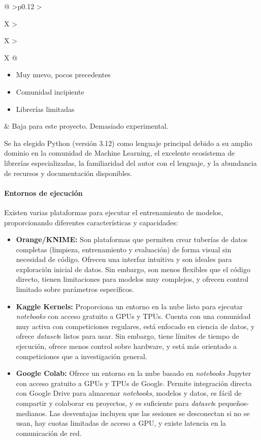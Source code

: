 \begin{xltabular}{\textwidth}{@{} >{\centering\arraybackslash}p{0.12\textwidth} >{\raggedright\arraybackslash}X >{\raggedright\arraybackslash}X >{\raggedright\arraybackslash}X @{}}
	\begin{itemize}[nosep] \item Muy nuevo, pocos precedentes \item Comunidad incipiente \item Librerías limitadas \end{itemize} &
	Baja para este proyecto. Demasiado experimental. \\
\end{xltabular}
{\captionsetup{type=table,hypcap=false}\label{tab:comparativa_lenguajes_ann}}

\normalsize

Se ha elegido Python (versión 3.12) como lenguaje principal debido a su amplio dominio en la comunidad de Machine Learning, el excelente ecosistema de librerías especializadas, la familiaridad del autor con el lenguaje, y la abundancia de recursos y documentación disponibles.

\paragraph{Entornos de ejecución}

Existen varias plataformas para ejecutar el entrenamiento de modelos, proporcionando diferentes características y capacidades:

\begin{itemize}
    \item \textbf{Orange/KNIME:} Son plataformas que permiten crear tuberías de datos completas (limpieza, entrenamiento y evaluación) de forma visual sin necesidad de código. Ofrecen una interfaz intuitiva y son ideales para exploración inicial de datos. Sin embargo, son menos flexibles que el código directo, tienen limitaciones para modelos muy complejos, y ofrecen control limitado sobre parámetros específicos.
    
    \item \textbf{Kaggle Kernels:} Proporciona un entorno en la nube listo para ejecutar \textit{notebooks} con acceso gratuito a GPUs y TPUs. Cuenta con una comunidad muy activa con competiciones regulares, está enfocado en ciencia de datos, y ofrece \textit{dataset}s listos para usar. Sin embargo, tiene límites de tiempo de ejecución, ofrece menos control sobre hardware, y está más orientado a competiciones que a investigación general.
    
    \item \textbf{Google Colab:} Ofrece un entorno en la nube basado en \textit{notebooks} Jupyter con acceso gratuito a GPUs y TPUs de Google. Permite integración directa con Google Drive para almacenar \textit{notebooks}, modelos y datos, es fácil de compartir y colaborar en proyectos, y es suficiente para \textit{dataset}s pequeños-medianos. Las desventajas incluyen que las sesiones se desconectan si no se usan, hay cuotas limitadas de acceso a GPU, y existe latencia en la comunicación de red.
\end{itemize}

